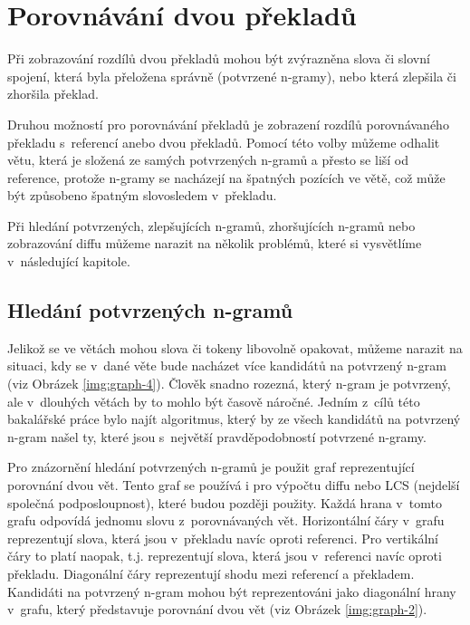 \chapter{Porovnávání dvou překladů}
\label{chap:compare}

Při zobrazování rozdílů dvou překladů mohou být zvýrazněna slova či slovní spojení,
  která byla přeložena správně (potvrzené \mbox{n-gramy}),
  nebo která zlepšila či zhoršila překlad.

Druhou možností pro porovnávání překladů je zobrazení rozdílů porovnávaného překladu s~referencí
  anebo dvou překladů.
Pomocí této volby můžeme odhalit větu,
  která je složená ze samých potvrzených \mbox{n-gramů} a přesto se liší od reference,
  protože \mbox{n-gramy} se nacházejí na špatných pozících ve větě,
  což může být způsobeno špatným slovosledem v~překladu.

Při hledání potvrzených, zlepšujících \mbox{n-gramů}, zhoršujících \mbox{n-gramů} nebo zobrazování diffu můžeme narazit na několik problémů,
  které si vysvětlíme v~následující kapitole.

\section{Hledání potvrzených \mbox{n-gramů}}
Jelikož se ve větách mohou slova či tokeny libovolně opakovat,
  můžeme narazit na situaci,
  kdy se v~dané věte bude nacházet více kandidátů na potvrzený \mbox{n-gram} (viz Obrázek \ref{img:graph-4}).
Člověk snadno rozezná,
  který \mbox{n-gram} je potvrzený,
  ale v~dlouhých větách by to mohlo být časově náročné.
Jedním z~cílů této bakalářské práce bylo najít algoritmus,
  který by ze všech kandidátů na potvrzený \mbox{n-gram} našel ty,
  které jsou s~největší pravděpodobností potvrzené \mbox{n-gramy}.

Pro znázornění hledání potvrzených \mbox{n-gramů} je použit graf reprezentující porovnání dvou vět.
Tento graf se používá i pro výpočtu diffu nebo LCS (nejdelší společná podposloupnost),
  které budou později použity.
Každá hrana v~tomto grafu odpovídá jednomu slovu z~porovnávaných vět.
Horizontální čáry v~grafu reprezentují slova, která jsou v~překladu navíc oproti referenci. 
Pro vertikální čáry to platí naopak, t.j. reprezentují slova, která jsou v~referenci navíc oproti překladu.
Diagonální čáry reprezentují shodu mezi referencí a překladem.
Kandidáti na potvrzený \mbox{n-gram} mohou být reprezentováni jako diagonální hrany v~grafu,
  který představuje porovnání dvou vět (viz Obrázek \ref{img:graph-2}).

